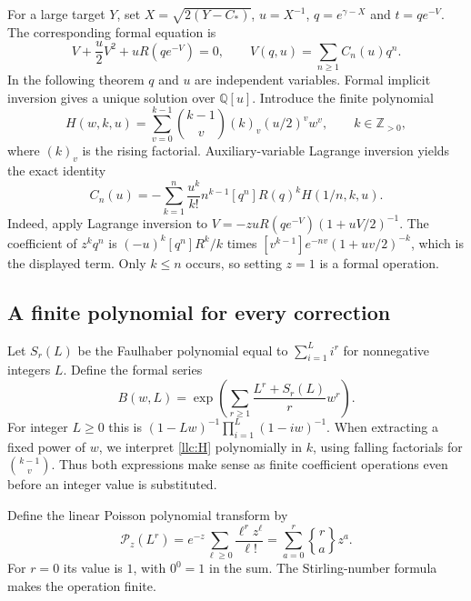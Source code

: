 For a large target $Y$, set $X=\sqrt{2(Y-C_*)}$, $u=X^{-1}$,
$q=e^{\gamma-X}$ and $t=qe^{-V}$. The corresponding formal equation is
\begin{equation}\label{llc:inverse-equation}
 V+\frac u2V^2+uR(qe^{-V})=0,\qquad
 V(q,u)=\sum_{n\ge1}C_n(u)q^n.
\end{equation}
In the following theorem $q$ and $u$ are independent variables.
Formal implicit inversion gives a unique solution over $\mathbb Q[u]$.
Introduce the finite polynomial
\begin{equation}\label{llc:H}
 H(w,k,u)=\sum_{v=0}^{k-1}\binom{k-1}{v}(k)_v
                       (u/2)^v w^v,\qquad k\in\mathbb Z_{>0},
\end{equation}
where $(k)_v$ is the rising factorial. Auxiliary-variable Lagrange
inversion yields the exact identity
\begin{equation}\label{llc:finite}
 C_n(u)=-\sum_{k=1}^n\frac{u^k}{k!}n^{k-1}
                     [q^n]R(q)^k H(1/n,k,u).
\end{equation}
Indeed, apply Lagrange inversion to
$V=-z uR(qe^{-V})(1+uV/2)^{-1}$. The coefficient of $z^kq^n$
is $(-u)^k[q^n]R^k/k$ times
$[v^{k-1}]e^{-nv}(1+uv/2)^{-k}$, which is the displayed term.
Only $k\le n$ occurs, so setting $z=1$ is a formal operation.

\subsection{A finite polynomial for every correction}

Let $S_r(L)$ be the Faulhaber polynomial equal to
$\sum_{i=1}^L i^r$ for nonnegative integers $L$. Define the formal series
\begin{equation}\label{llc:B}
 B(w,L)=\exp\left(\sum_{r\ge1}\frac{L^r+S_r(L)}r w^r\right).
\end{equation}
For integer $L\ge0$ this is
$(1-Lw)^{-1}\prod_{i=1}^L(1-iw)^{-1}$.
When extracting a fixed power of $w$, we interpret \eqref{llc:H}
polynomially in $k$, using falling factorials for $\binom{k-1}{v}$.
Thus both expressions make sense as finite coefficient operations
even before an integer value is substituted.

Define the linear Poisson polynomial transform by
\begin{equation}\label{llc:poisson}
 \mathcal P_z(L^r)=e^{-z}\sum_{\ell\ge0}\frac{\ell^r z^\ell}{\ell!}
                 =\sum_{a=0}^r {r\brace a}z^a.
\end{equation}
For $r=0$ its value is $1$, with $0^0=1$ in the sum.
The Stirling-number formula makes the operation finite.

